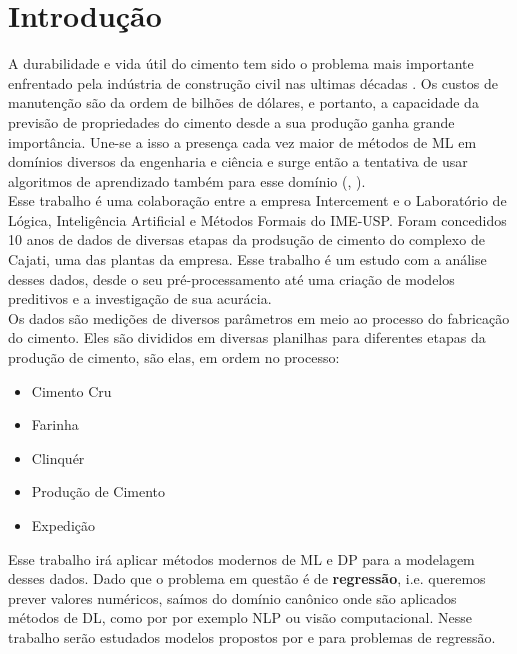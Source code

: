\chapter{Introdução}
\label{cap:introducao}


A durabilidade e vida útil do cimento tem sido o problema mais importante enfrentado pela indústria de construção civil nas ultimas décadas \citep{cementml}. Os custos de manutenção são da ordem de bilhões de dólares, e portanto, a capacidade da previsão de propriedades do cimento desde a sua produção ganha grande importância. Une-se a isso a presença cada vez maior de métodos de ML em domínios diversos da engenharia e ciência e surge então a tentativa de usar algoritmos de aprendizado também para esse domínio (\cite{cementnn1}, \cite{cementnn2}). \\ 

Esse trabalho é uma colaboração entre a empresa Intercement e o Laboratório de
Lógica, Inteligência Artificial e Métodos Formais do IME-USP. Foram concedidos
10 anos de dados de diversas etapas da prodsução de cimento do complexo de
Cajati, uma das plantas da empresa. Esse trabalho é um estudo com a análise
desses dados, desde o seu pré-processamento até uma criação de modelos
preditivos e a investigação de sua acurácia. \\


Os dados são medições de diversos parâmetros em meio ao processo do fabricação do cimento. Eles são divididos em diversas planilhas para diferentes etapas da produção de cimento, são elas, em ordem no processo:

\begin{itemize}
        \item Cimento Cru
        \item Farinha
        \item Clinquér
        \item Produção de Cimento
        \item Expedição
\end{itemize}


Esse trabalho irá aplicar métodos modernos de ML e DP para a modelagem desses dados. Dado que o problema em questão é de \textbf{regressão}, i.e. queremos prever valores numéricos, saímos do domínio canônico onde são aplicados métodos de DL, como por por exemplo NLP ou visão computacional. Nesse trabalho serão estudados modelos propostos por \citet{ubertime} e \citet{energylstm} para problemas de regressão.

